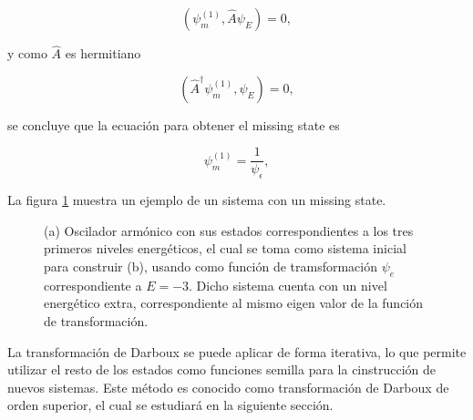 \begin{equation*}
(\psi^{(1)}_m, \hat{A} \psi_E) = 0,
\end{equation*}

y como $\hat{A}$ es hermitiano

\begin{equation*}
(\hat{A}^\dagger \psi^{(1)}_m, \psi_E) = 0,
\end{equation*}

se concluye que la ecuación para obtener el missing state es

\begin{equation*}
\psi^{(1)}_m = \frac{1}{\psi_\epsilon},
\end{equation*}

La figura \ref{TD1OA-Figure} muestra un ejemplo de un sistema con un missing state.

\begin{figure}
	\centering
	\hfill%
	\caption{\label{TD1OA-Figure} (a) Oscilador armónico con sus estados correspondientes a los tres primeros niveles energéticos, el cual se toma como sistema inicial para construir (b), usando como función de tramsformación $\psi_e$ correspondiente a $E= -3$. Dicho sistema cuenta con un nivel energético extra, correspondiente al mismo eigen valor de la función de transformación.}
\end{figure}

La transformación de Darboux se puede aplicar de forma iterativa, lo que permite utilizar el resto de los estados como funciones semilla para la cinstrucción de nuevos sistemas. Este método es conocido como transformación de Darboux de orden superior, el cual se estudiará en la siguiente sección.
